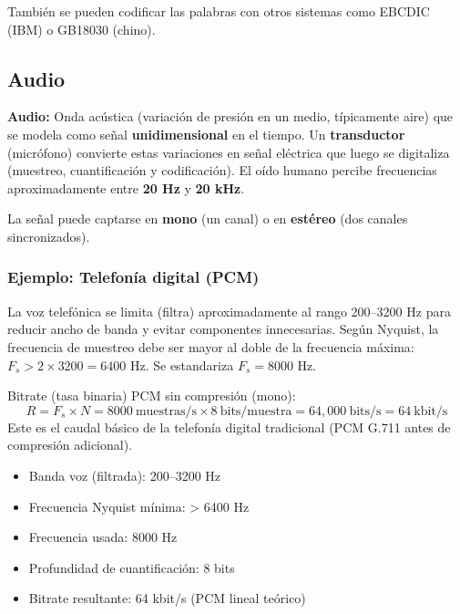 \documentclass[11pt,a4paper]{article}
\begin{document}
También se pueden codificar las palabras con otros sistemas como EBCDIC (IBM) o GB18030 (chino).

\subsection{Audio}

\begin{DefBox}
\textbf{Audio:} Onda acústica (variación de presión en un medio, típicamente aire) que se modela como señal \textbf{unidimensional} en el tiempo. Un \textbf{transductor} (micrófono) convierte estas variaciones en señal eléctrica que luego se digitaliza (muestreo, cuantificación y codificación). El oído humano percibe frecuencias aproximadamente entre \textbf{20 Hz} y \textbf{20 kHz}.
\end{DefBox}

\begin{NotaBox}
La señal puede captarse en \textbf{mono} (un canal) o en \textbf{estéreo} (dos canales sincronizados).
\end{NotaBox}

\subsubsection*{Ejemplo: Telefonía digital (PCM)}
\begin{DefBox}
La voz telefónica se limita (filtra) aproximadamente al rango 200--3200 Hz para reducir ancho de banda y evitar componentes innecesarias. Según Nyquist, la frecuencia de muestreo debe ser mayor al doble de la frecuencia máxima: $F_s > 2 \times 3200 = 6400$ Hz. Se estandariza $F_s = 8000$ Hz.
\end{DefBox}

\begin{NotaBox}
Bitrate (tasa binaria) PCM sin compresión (mono):
\begin{equation*}
R = F_s \times N = 8000\ \text{muestras/s} \times 8\ \text{bits/muestra} = 64{,}000\ \text{bits/s} = 64\ \text{kbit/s}
\end{equation*}
Este es el caudal básico de la telefonía digital tradicional (PCM G.711 antes de compresión adicional).
\end{NotaBox}

\begin{ChecklistBox}
\begin{itemize}
	\item Banda voz (filtrada): 200--3200 Hz
	\item Frecuencia Nyquist mínima: > 6400 Hz
	\item Frecuencia usada: 8000 Hz
	\item Profundidad de cuantificación: 8 bits
	\item Bitrate resultante: 64 kbit/s (PCM lineal teórico)
\end{itemize}
\end{ChecklistBox}
\end{document}
